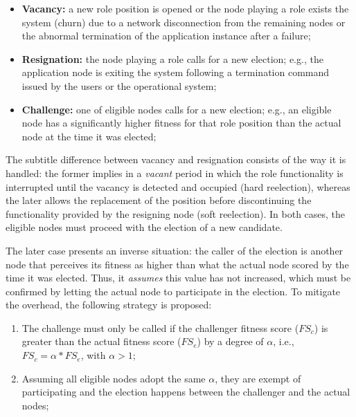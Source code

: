 \begin{itemize}
	
	\item \textbf{Vacancy:} a new role position is opened or the node playing a role exists the system (churn) due to a network disconnection from the remaining nodes or the abnormal termination of the application instance after a failure;
	
	\item \textbf{Resignation:} the node playing a role calls for a new election; e.g., the application node is exiting the system following a termination command issued by the users or the operational system;
	
	\item \textbf{Challenge:} one of eligible nodes calls for a new election; e.g., an eligible node has a significantly higher fitness for that role position than the actual node at the time it was elected;
	
	
\end{itemize}
\medskip
 
The subtitle difference between vacancy and resignation consists of the way it is handled: the former implies in a \textit{vacant} period in which the role functionality is interrupted until the vacancy is detected and occupied (hard reelection), whereas the later allows the replacement of the position before discontinuing the functionality provided by the resigning node (soft reelection). In both cases, the eligible nodes must proceed with the election of a new candidate.

The later case presents an inverse situation: the caller of the election is another node that perceives its fitness as higher than what the actual node scored by the time it was elected. Thus, it \textit{assumes} this value has not increased, which must be confirmed by letting the actual node to participate in the election. To mitigate the overhead, the following strategy is proposed:

\begin{enumerate}

\item The challenge must only be called if the challenger fitness score ($FS_c$) is greater than the actual fitness score ($FS_e$) by a degree of $\alpha$, i.e., $FS_c = \alpha * FS_e$, with $\alpha > 1$;

\item Assuming all eligible nodes adopt the same $\alpha$, they are exempt of participating and the election happens between the challenger and the actual nodes;

\end{enumerate}

